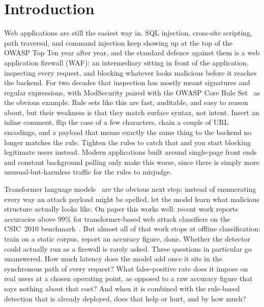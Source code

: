 \documentclass[conference]{IEEEtran}
\begin{document}
\section{Introduction}
Web applications are still the easiest way in. SQL injection, cross-site
scripting, path traversal, and command injection keep showing up at the top
of the OWASP Top Ten year after year, and the standard defence against them
is a web application firewall (WAF): an intermediary sitting in front of the
application, inspecting every request, and blocking whatever looks
malicious before it reaches the backend. For two decades that inspection has
mostly meant signatures and regular expressions, with ModSecurity paired
with the OWASP Core Rule Set~\cite{owaspcrs} as the obvious example. Rule sets
like this are fast, auditable, and easy to reason about, but their weakness
is that they match surface syntax, not intent. Insert an inline comment,
flip the case of a few characters, chain a couple of URL encodings, and a
payload that means exactly the same thing to the backend no longer matches
the rule. Tighten the rules to catch that and you start blocking legitimate
users instead. Modern applications built around single-page front ends and
constant background polling only make this worse, since there is simply
more unusual-but-harmless traffic for the rules to misjudge.

Transformer language models~\cite{vaswani2017attention,devlin2019bert} are
the obvious next step: instead of enumerating every way an attack payload
might be spelled, let the model learn what malicious structure actually
looks like. On paper this works well: recent work reports accuracies above
$99\%$ for transformer-based web attack classifiers on the CSIC~2010
benchmark~\cite{wadbert2026,liu2024bertlstm}. But almost all of that work
stops at offline classification: train on a static corpus, report an
accuracy figure, done. Whether the detector could actually run as a
firewall is rarely asked. Three questions in particular go unanswered.
How much latency does the model add once it sits in the synchronous path of
every request? What false-positive rate does it impose on real users at a
chosen operating point, as opposed to a raw accuracy figure that says
nothing about that cost? And when it is combined with the rule-based
detection that is already deployed, does that help or hurt, and by how much?
\end{document}
